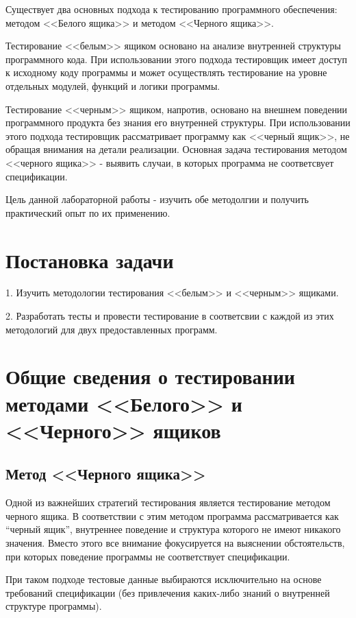 \documentclass[12pt]{article}
\begin{document}
Существует два основных подхода к тестированию программного обеспечения: методом <<Белого ящика>>  и методом <<Черного ящика>>.

Тестирование <<белым>> ящиком основано на анализе внутренней структуры программного кода. При использовании этого подхода тестировщик имеет доступ к исходному коду программы и может осуществлять тестирование на уровне отдельных модулей, функций и логики программы. 

Тестирование <<черным>> ящиком, напротив, основано на внешнем поведении программного продукта без знания его внутренней структуры. При использовании этого подхода тестировщик рассматривает программу как <<черный ящик>>, не обращая внимания на детали реализации. Основная задача тестирования методом <<черного ящика>> - выявить случаи, в которых программа не соответсвует спецификации.


Цель данной лабораторной работы - изучить обе методолгии и  получить практический опыт по их применению.
\newpage

\section{Постановка задачи}

1. Изучить методологии тестирования <<белым>> и  <<черным>> ящиками.

2. Разработать тесты и провести тестирование в соответсвии с каждой из этих методологий для двух предоставленных программ.

\newpage


\section{Общие сведения о тестировании методами <<Белого>>  и <<Черного>> ящиков}

\subsection{Метод <<Черного ящика>>}


Одной из важнейших стратегий тестирования является тестирование методом черного ящика. В соответствии с этим методом программа рассматривается как “черный ящик”, внутреннее поведение и структура которого не имеют никакого значения. Вместо этого все внимание фокусируется на выяснении обстоятельств, при которых поведение программы не соответствует спецификации.


При таком подходе тестовые данные выбираются исключительно на основе требований спецификации (без привлечения каких-либо знаний о внутренней структуре программы).
\end{document}
